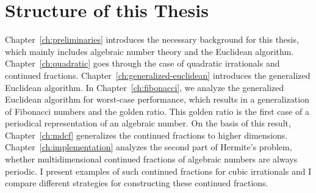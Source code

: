 \section{Structure of this Thesis}

Chapter~\ref{ch:preliminaries} introduces the necessary background for this thesis,
which mainly includes algebraic number theory and the Euclidean algorithm.
Chapter~\ref{ch:quadratic} goes through the case of quadratic irrationals
and continued fractions.
Chapter~\ref{ch:generalized-euclidean} introduces the generalized Euclidean algorithm.
In Chapter~\ref{ch:fibonacci}, we analyze the generalized Euclidean algorithm for worst-case performance,
which results in a generalization of Fibonacci numbers and the golden ratio.
This golden ratio is the first case of a periodical representation of an algebraic number.
On the basis of this result, Chapter~\ref{ch:mdcf} generalizes the continued fractions to higher dimensions.
Chapter~\ref{ch:implementation} analyzes the second part of Hermite's problem,
whether multidimensional continued fractions of algebraic numbers are always periodic.
I present examples of such continued fractions for cubic irrationals and I
compare different strategies for constructing these continued fractions.

